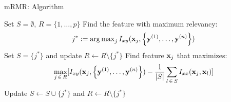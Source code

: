 \documentclass[11pt,compress,t,notes=noshow, xcolor=table]{beamer}
\begin{document}
  \begin{vbframe}{\MakeLowercase{m}RMR: Algorithm}

  \begin{algorithm}[H]
  \footnotesize
    \begin{algorithmic}[1]
      \State Set $S = \emptyset$, $R = \{ 1, \dots, p \}$
      \State Find the feature with maximum relevancy:
      $$j^* := \operatorname{arg\,max}_{j} I_{xy} (\mathbf{x}_j, \left\{ \mathbf{y}^{(1)}, \ldots, \mathbf{y}^{(n)}\right\})$$
      \State Set $S = \{ j^* \}$ and update $R \leftarrow R \setminus \{j^* \}$
      \Repeat
        \State Find feature $\mathbf{x}_j$ that maximizes:
        $$\max_{j \, \in \, R} [ I_{xy} (\mathbf{x}_j, \left\{ \mathbf{y}^{(1)}, \ldots, \mathbf{y}^{(n)}\right\}) - \frac{1}{|S|} \sum_{l \, \in \, S} I_{xx}(\mathbf{x}_j, \mathbf{x}_l)  ]$$
        \State Update $S \leftarrow S \cup \{j^* \}$ and $R \leftarrow R \setminus \{ j^* \}$
      \caption{mRMR algorithm}
    \end{algorithmic}
  \end{algorithm}
  \end{vbframe}


  
  
  
  
  
  
  
  
  
\end{document}
